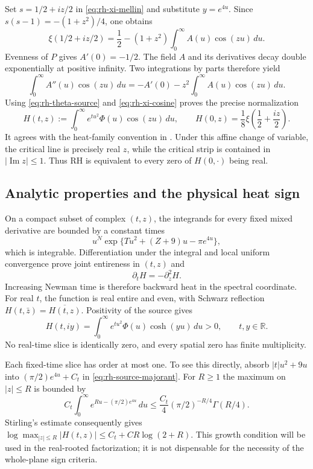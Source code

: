 \documentclass[11pt]{article}
\numberwithin{equation}{section}
\theoremstyle{definition}
\theoremstyle{remark}
\begin{document}
Set $s=1/2+iz/2$ in \eqref{eq:rh-xi-mellin} and substitute
$y=e^{4u}$.  Since $s(s-1)=-(1+z^2)/4$, one obtains
\begin{equation}
 \xi(1/2+iz/2)=\frac12-(1+z^2)
 \int_0^\infty A(u)\cos(zu)\,du.
 \label{eq:rh-xi-cosine}
\end{equation}
Evenness of $P$ gives $A'(0)=-1/2$.  The field $A$ and its derivatives
decay double exponentially at positive infinity.  Two integrations by
parts therefore yield
\[
 \int_0^\infty A''(u)\cos(zu)\,du
 =-A'(0)-z^2\int_0^\infty A(u)\cos(zu)\,du.
\]
Using \eqref{eq:rh-theta-source} and \eqref{eq:rh-xi-cosine} proves
the precise normalization
\begin{equation}
 H(t,z):=\int_0^\infty e^{tu^2}\Phi(u)\cos(zu)\,du,
 \qquad
 H(0,z)=\frac18\xi\!\left(\frac12+\frac{iz}{2}\right).
 \label{eq:rh-H-normalization}
\end{equation}
It agrees with the heat-family convention in \cite{polymath}.
Under this affine change of variable, the critical line is precisely
real $z$, while the critical strip is contained in $|\operatorname{Im}z|\le1$.
Thus RH is equivalent to every zero of $H(0,\cdot)$ being real.

\subsection{Analytic properties and the physical heat sign}

On a compact subset of complex $(t,z)$, the integrands for every fixed
mixed derivative are bounded by a constant times
\[
 u^N\exp\{T u^2+(Z+9)u-\pi e^{4u}\},
\]
which is integrable.  Differentiation under the integral and local uniform
convergence prove joint entireness in $(t,z)$ and
\begin{equation}
 \partial_tH=-\partial_z^2H.
 \label{eq:rh-physical-heat}
\end{equation}
Increasing Newman time is therefore backward heat in the spectral
coordinate.  For real $t$, the function is real entire and even, with
Schwarz reflection $H(t,\bar z)=\overline{H(t,z)}$.  Positivity of
the source gives
\begin{equation}
 H(t,iy)=\int_0^\infty e^{tu^2}\Phi(u)\cosh(yu)\,du>0,
 \qquad t,y\in\mathbb R.
 \label{eq:rh-imaginary-nonzero}
\end{equation}
No real-time slice is identically zero, and every spatial zero has finite
multiplicity.

Each fixed-time slice has order at most one.  To see this directly, absorb
$|t|u^2+9u$ into $(\pi/2)e^{4u}+C_t$ in
\eqref{eq:rh-source-majorant}.  For $R\ge1$ the maximum on $|z|\le R$
is bounded by
\[
 C_t\int_0^\infty e^{Ru-(\pi/2)e^{4u}}\,du
 \le\frac{C_t}4(\pi/2)^{-R/4}\Gamma(R/4).
\]
Stirling's estimate consequently gives
$\log\max_{|z|\le R}|H(t,z)|\le C_t+C R\log(2+R)$.
This growth condition will be used in the real-rooted factorization;
it is not dispensable for the necessity of the whole-plane sign criteria.
\end{document}
